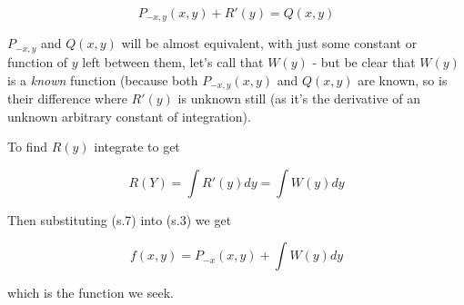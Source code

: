 \documentclass{article}
\begin{document}
\[ \tag{s.6} P_{-x,y}(x,y) + R'(y) = Q(x,y) \]

$P_{-x,y}$ and $Q(x,y)$ will be almost equivalent, with just some constant or function of $y$ left between them, let's call that $W(y)$ - but be clear that $W(y)$ is a \emph{known} function (because both $P_{-x,y}(x,y)$ and $Q(x,y)$ are known, so is their difference where $R'(y)$ is unknown still (as it's the derivative of an unknown arbitrary constant of integration).

To find $R(y)$ integrate to get

\[ \tag{s.7} R(Y) = \int R'(y) dy = \int W(y) dy \]

Then substituting (s.7) into (s.3) we get

\[ \tag{s.8} f(x,y) = P_{-x}(x,y) + \int W(y) dy \]

which is the function we seek.
\end{document}
